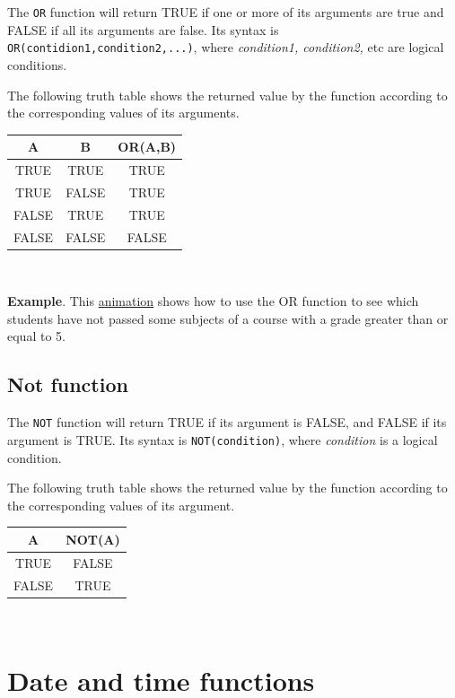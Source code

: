 The \texttt{OR} function will return TRUE if one or more of its arguments are true and FALSE if all its arguments are false. Its syntax is \texttt{OR(contidion1,condition2,...)}, where \emph{condition1, condition2,} etc are logical conditions.

The following truth table shows the returned value by the function according to the corresponding values of its arguments.

\begin{longtable}{|c|c|c|}
\hline
A & B & OR(A,B)\\
\hline
TRUE & TRUE & TRUE\\
TRUE & FALSE & TRUE\\
FALSE & TRUE & TRUE\\
FALSE & FALSE & FALSE\\
\hline
\end{longtable}

~{}

\textbf{Example}. This \href{http://aprendeconalf.es/office/excel/manual/img/example_function_or.gif}{animation} shows how to use the OR function to see which students have not passed some subjects of a course with a grade greater than or equal to 5.

\subsection{Not function}\hypertarget{not-function}{}\label{not-function}

The \texttt{NOT} function will return TRUE if its argument is FALSE, and FALSE if its argument is TRUE. Its syntax is \texttt{NOT(condition)}, where \emph{condition} is a logical condition.

The following truth table shows the returned value by the function according to the corresponding values of its argument.

\begin{longtable}{|c|c|}
\hline
A & NOT(A)\\
\hline
TRUE & FALSE\\
FALSE & TRUE\\
\hline
\end{longtable}

~{}

\section{Date and time functions}\hypertarget{date-and-time-functions}{}\label{date-and-time-functions}

